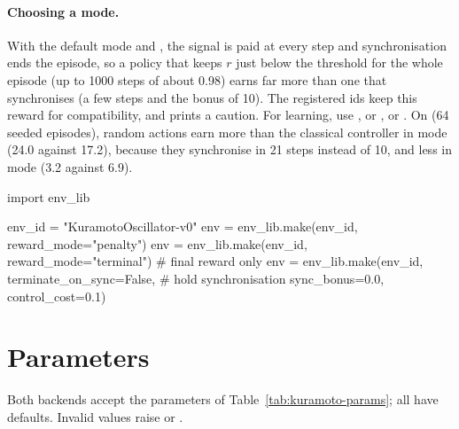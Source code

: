 \paragraph{Choosing a mode.} With the default  mode and
, the signal is paid at every step and
synchronisation ends the episode, so a policy that keeps $r$ just below the
threshold for the whole episode (up to 1000 steps of about 0.98) earns far
more than one that synchronises (a few steps and the bonus of 10). The
registered ids keep this reward for compatibility, and 
prints a caution. For learning, use ,  or
, or . On
 (64 seeded episodes), random actions earn more
than the classical controller in  mode (24.0 against 17.2),
because they synchronise in 21 steps instead of 10, and less in
 mode (3.2 against 6.9).

\begin{pycode}
import env_lib

env_id = "KuramotoOscillator-v0"
env = env_lib.make(env_id, reward_mode="penalty")
env = env_lib.make(env_id, reward_mode="terminal")        # final reward only
env = env_lib.make(env_id, terminate_on_sync=False,       # hold synchronisation
                   sync_bonus=0.0, control_cost=0.1)
\end{pycode}

\section{Parameters}\label{sec:kuramoto-params}

Both backends accept the parameters of Table~\ref{tab:kuramoto-params}; all
have defaults. Invalid values raise  or .

